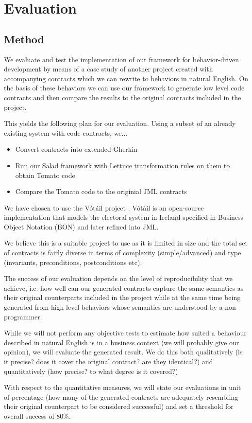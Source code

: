 \section{Evaluation}
\subsection{Method}

We evaluate and test the implementation of our framework for behavior-driven development by means of a case study of another project created with accompanying contracts which we can rewrite to behaviors in natural English. On the basis of these behaviors we can use our framework to generate low level code contracts and then compare the results to the original contracts included in the project.
 
This yields the following plan for our evaluation. Using a subset of an already existing system with code contracts, we...

\begin{itemize}
	\item Convert contracts into extended Gherkin
	\item Run our Salad framework with Lettuce transformation rules on them to obtain Tomato code
	\item Compare the Tomato code to the originial JML contracts
\end{itemize}

We have chosen to use the V\'{o}t\'{a}il project \cite{votailCochranKiniry}. V\'{o}t\'{a}il is an open-source implementation that models the electoral system in Ireland specified in Business Object Notation (BON) \cite{bonmethod} and later refined into JML.
 
We believe this is a suitable project to use as it is limited in size and the total set of contracts is fairly diverse in terms of complexity (simple/advanced) and type (invariants, preconditions, postconditions etc).

The success of our evaluation depends on the level of reproducibility that we achieve, i.e. how well can our generated contracts capture the same semantics as their original counterparts included in the project while at the same time being generated from high-level behaviors whose semantics are understood by a non-programmer.
 
While we will not perform any objective tests to estimate how suited a behaviour described in natural English is in a business context (we will probably give our opinion), we will evaluate the generated result. We do this both qualitatively (is it precise? does it cover the original contract? are they identical?) and quantitatively (how precise? to what degree is it covered?)
 
With respect to the quantitative measures, we will state our evaluations in unit of percentage (how many of the generated contracts are adequately resembling their original counterpart to be considered successful) and set a threshold for overall success of 80\%.